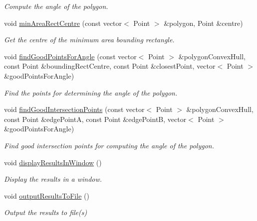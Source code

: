 \begin{DoxyCompactItemize}
\begin{DoxyCompactList}\small\item\em Compute the angle of the polygon. \end{DoxyCompactList}\item 
void \hyperlink{classmultiscale_1_1analysis_1_1Detector_aeef6f9f7e29c79362df3469a0a5caafe}{min\-Area\-Rect\-Centre} (const vector$<$ Point $>$ \&polygon, Point \&centre)
\begin{DoxyCompactList}\small\item\em Get the centre of the minimum area bounding rectangle. \end{DoxyCompactList}\item 
void \hyperlink{classmultiscale_1_1analysis_1_1Detector_a9785ec165eb57a95243c5bcf679bc49b}{find\-Good\-Points\-For\-Angle} (const vector$<$ Point $>$ \&polygon\-Convex\-Hull, const Point \&bounding\-Rect\-Centre, const Point \&closest\-Point, vector$<$ Point $>$ \&good\-Points\-For\-Angle)
\begin{DoxyCompactList}\small\item\em Find the points for determining the angle of the polygon. \end{DoxyCompactList}\item 
void \hyperlink{classmultiscale_1_1analysis_1_1Detector_a2d8fe1a58bc6c792a45ffca988f2afe7}{find\-Good\-Intersection\-Points} (const vector$<$ Point $>$ \&polygon\-Convex\-Hull, const Point \&edge\-Point\-A, const Point \&edge\-Point\-B, vector$<$ Point $>$ \&good\-Points\-For\-Angle)
\begin{DoxyCompactList}\small\item\em Find good intersection points for computing the angle of the polygon. \end{DoxyCompactList}\item 
void \hyperlink{classmultiscale_1_1analysis_1_1Detector_abb6d85e1a13e96b748ea286a070bdf18}{display\-Results\-In\-Window} ()
\begin{DoxyCompactList}\small\item\em Display the results in a window. \end{DoxyCompactList}\item 
void \hyperlink{classmultiscale_1_1analysis_1_1Detector_a2eb7c5f8faefb9b8f09f94f88f804d80}{output\-Results\-To\-File} ()
\begin{DoxyCompactList}\small\item\em Output the results to file(s) \end{DoxyCompactList}\item 

\end{DoxyCompactItemize}
